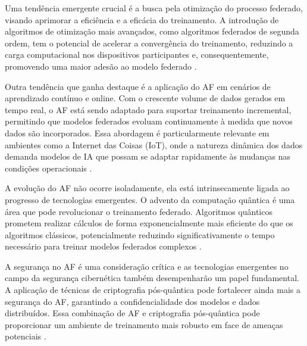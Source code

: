 Uma tendência emergente crucial é a busca pela otimização do processo federado, visando aprimorar a eficiência e a eficácia do treinamento. A introdução de algoritmos de otimização mais avançados, como algoritmos federados de segunda ordem, tem o potencial de acelerar a convergência do treinamento, reduzindo a carga computacional nos dispositivos participantes e, consequentemente, promovendo uma maior adesão ao modelo federado \cite{konecny2016federated}.

Outra tendência que ganha destaque é a aplicação do AF em cenários de aprendizado contínuo e online. Com o crescente volume de dados gerados em tempo real, o AF está sendo adaptado para suportar treinamento incremental, permitindo que modelos federados evoluam continuamente à medida que novos dados são incorporados. Essa abordagem é particularmente relevante em ambientes como a Internet das Coisas (IoT), onde a natureza dinâmica dos dados demanda modelos de IA que possam se adaptar rapidamente às mudanças nas condições operacionais \cite{mohassel2017secureml}.

A evolução do AF não ocorre isoladamente, ela está intrinsecamente ligada ao progresso de tecnologias emergentes. O advento da computação quântica é uma área que pode revolucionar o treinamento federado. Algoritmos quânticos prometem realizar cálculos de forma exponencialmente mais eficiente do que os algoritmos clássicos, potencialmente reduzindo significativamente o tempo necessário para treinar modelos federados complexos \cite{aaronson2016read}.

A segurança no AF é uma consideração crítica e as tecnologias emergentes no campo da segurança cibernética também desempenharão um papel fundamental. A aplicação de técnicas de criptografia pós-quântica pode fortalecer ainda mais a segurança do AF, garantindo a confidencialidade dos modelos e dados distribuídos. Essa combinação de AF e criptografia pós-quântica pode proporcionar um ambiente de treinamento mais robusto em face de ameaças potenciais \cite{giovanni2020postquantum}.
